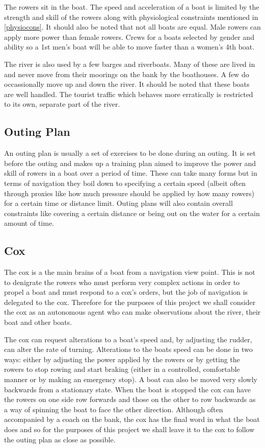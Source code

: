 The rowers sit in the boat. The speed and acceleration of a boat
is limited by the strength and skill of the rowers along with
physiological constraints mentioned in \ref{physiocons}. It should also be noted that
not all boats are equal. Male rowers can apply more power than female
rowers. Crews for a boats selected by gender and ability so a 1st men's boat will
be able to move faster than a women's 4th boat.

The river is also used by a few barges and riverboats. Many of these
are lived in and never move from their moorings on the bank by the boathouses. A few do occassionally move
up and down the river. It should be noted that these boats are well
handled. The tourist traffic which behaves more erratically is
restricted to its own, separate part of the river.

\subsection{Outing Plan}
An outing plan is usually a set of exercises to be done during an
outing. It is set before the outing and makes up a training plan aimed
to improve the power and skill of rowers in a boat over a period of time. These can take many forms but in terms of navigation they boil
down to specifying a certain speed (albeit often through proxies like
how much pressure should be applied by how many rowers) for a certain
time or distance limit. Outing plans will also contain overall
constraints like covering a certain distance or being out on the water
for a certain amount of time.

\subsection{Cox}
The cox is a the main brains of a boat from a navigation view
point. This is not to denigrate the rowers who must perform very
complex actions in order to propel a boat and must respond to a cox's
orders, but the job of navigation
is delegated to the cox. Therefore for the purposes of this project we
shall consider the cox as an autonomous agent who can make observations about the
river, their boat and other boats. 

The cox can request alterations to
a boat's speed and, by adjusting the rudder, can alter the rate of
turning. Alterations to the boats speed can be done in two ways:
either by adjusting the power applied by the rowers or by getting the
rowers to stop rowing and start braking (either in a controlled, comfortable manner
or by making an emergency stop). A boat can also be moved very
slowly backwards from a stationary state. When the boat is stopped the
cox can have the rowers on one side row forwards and those on the other
to row backwards as a way of spinning the boat to face the other
direction. Although often accompanied by a coach on the bank, the cox
has the final word in what the boat does and so for the purposes of
this project we shall leave it to the cox to follow the outing plan
as close as possible.


